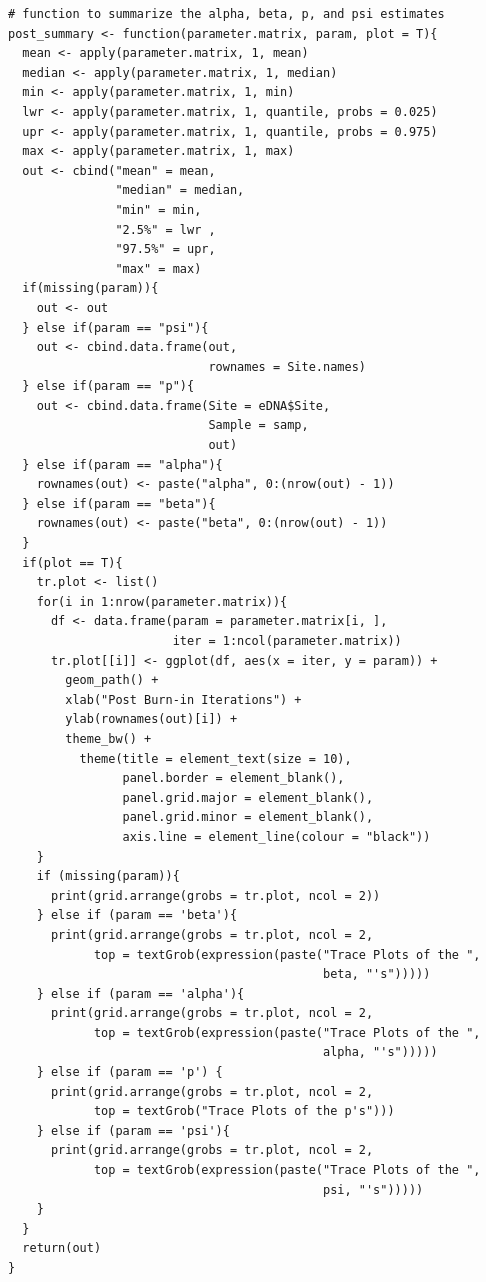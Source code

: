 \documentclass[12pt]{article}\usepackage[]{graphicx}\usepackage[]{color}
\makeatletter
\newenvironment{kframe}{%
 \def\at@end@of@kframe{}%
 \ifinner\ifhmode%
  \def\at@end@of@kframe{\end{minipage}}%
  \begin{minipage}{\columnwidth}%
 \fi\fi%
 \def\FrameCommand##1{\hskip\@totalleftmargin \hskip-\fboxsep
 \colorbox{shadecolor}{##1}\hskip-\fboxsep
     \hskip-\linewidth \hskip-\@totalleftmargin \hskip\columnwidth}%
 \MakeFramed {\advance\hsize-\width
   \@totalleftmargin\z@ \linewidth\hsize
   \@setminipage}}%
 {\par\unskip\endMakeFramed%
 \at@end@of@kframe}
\newenvironment{knitrout}{}{} %
\newenvironment{kframe}{%
 \def\at@end@of@kframe{}%
 \ifinner\ifhmode%
  \def\at@end@of@kframe{\end{minipage}}%
  \begin{minipage}{\columnwidth}%
 \fi\fi%
 \def\FrameCommand##1{\hskip\@totalleftmargin \hskip-\fboxsep
 \colorbox{shadecolor}{##1}\hskip-\fboxsep
     \hskip-\linewidth \hskip-\@totalleftmargin \hskip\columnwidth}%
 \MakeFramed {\advance\hsize-\width
   \@totalleftmargin\z@ \linewidth\hsize
   \@setminipage}}%
 {\par\unskip\endMakeFramed%
 \at@end@of@kframe}
\newenvironment{knitrout}{}{} %
\makeatother
\begin{document}
\begin{small}
\begin{knitrout}
\begin{kframe}
\begin{verbatim}
# function to summarize the alpha, beta, p, and psi estimates 
post_summary <- function(parameter.matrix, param, plot = T){
  mean <- apply(parameter.matrix, 1, mean)
  median <- apply(parameter.matrix, 1, median)
  min <- apply(parameter.matrix, 1, min)
  lwr <- apply(parameter.matrix, 1, quantile, probs = 0.025)
  upr <- apply(parameter.matrix, 1, quantile, probs = 0.975)
  max <- apply(parameter.matrix, 1, max)
  out <- cbind("mean" = mean, 
               "median" = median, 
               "min" = min, 
               "2.5%" = lwr , 
               "97.5%" = upr, 
               "max" = max)
  if(missing(param)){
    out <- out
  } else if(param == "psi"){
    out <- cbind.data.frame(out, 
                            rownames = Site.names)
  } else if(param == "p"){
    out <- cbind.data.frame(Site = eDNA$Site, 
                            Sample = samp, 
                            out)
  } else if(param == "alpha"){
    rownames(out) <- paste("alpha", 0:(nrow(out) - 1))
  } else if(param == "beta"){
    rownames(out) <- paste("beta", 0:(nrow(out) - 1))
  }
  if(plot == T){
    tr.plot <- list()
    for(i in 1:nrow(parameter.matrix)){
      df <- data.frame(param = parameter.matrix[i, ], 
                       iter = 1:ncol(parameter.matrix))
      tr.plot[[i]] <- ggplot(df, aes(x = iter, y = param)) + 
        geom_path() + 
        xlab("Post Burn-in Iterations") + 
        ylab(rownames(out)[i]) + 
        theme_bw() + 
          theme(title = element_text(size = 10),
                panel.border = element_blank(), 
                panel.grid.major = element_blank(),
                panel.grid.minor = element_blank(), 
                axis.line = element_line(colour = "black"))
    }
    if (missing(param)){
      print(grid.arrange(grobs = tr.plot, ncol = 2))
    } else if (param == 'beta'){
      print(grid.arrange(grobs = tr.plot, ncol = 2, 
            top = textGrob(expression(paste("Trace Plots of the ", 
                                            beta, "'s")))))
    } else if (param == 'alpha'){
      print(grid.arrange(grobs = tr.plot, ncol = 2, 
            top = textGrob(expression(paste("Trace Plots of the ", 
                                            alpha, "'s")))))
    } else if (param == 'p') {
      print(grid.arrange(grobs = tr.plot, ncol = 2, 
            top = textGrob("Trace Plots of the p's")))
    } else if (param == 'psi'){
      print(grid.arrange(grobs = tr.plot, ncol = 2, 
            top = textGrob(expression(paste("Trace Plots of the ", 
                                            psi, "'s")))))
    }
  } 
  return(out)
}



\end{verbatim}
\end{kframe}
\end{knitrout}
\end{small}
\end{document}
